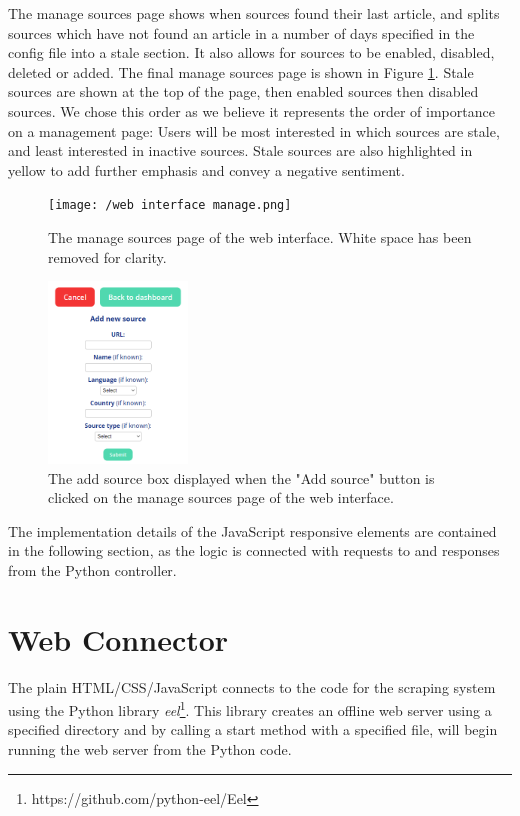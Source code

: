 \documentclass{l4proj}
\begin{document}
The manage sources page shows when sources found their last article, and splits sources which have not found an article in a number of days specified in the config file into a stale section. It also allows for sources to be enabled, disabled, deleted or added. The final manage sources page is shown in Figure \ref{fig:web-interface-manage}. Stale sources are shown at the top of the page, then enabled sources then disabled sources. We chose this order as we believe it represents the order of importance on a management page: Users will be most interested in which sources are stale, and least interested in inactive sources. Stale sources are also highlighted in yellow to add further emphasis and convey a negative sentiment. 

\begin{figure}[!ht]
\centering
\texttt{[image: /web interface manage.png]}
\caption{The manage sources page of the web interface. White space has been removed for clarity.}
\label{fig:web-interface-manage}
\end{figure}

\begin{figure}[!ht]
\centering
\includegraphics[width=0.33\textwidth]{images/add-source-box.png}
\caption{The add source box displayed when the "Add source" button is clicked on the manage sources page of the web interface.}
\label{fig:add-sources-box}
\end{figure}

The implementation details of the JavaScript responsive elements are contained in the following section, as the logic is connected with requests to and responses from the Python controller.

\section{Web Connector}
The plain HTML/CSS/JavaScript connects to the code for the scraping system using the Python library \emph{eel}\footnote{https://github.com/python-eel/Eel}. This library creates an offline web server using a specified directory and by calling a start method with a specified file, will begin running the web server from the Python code.
\end{document}
